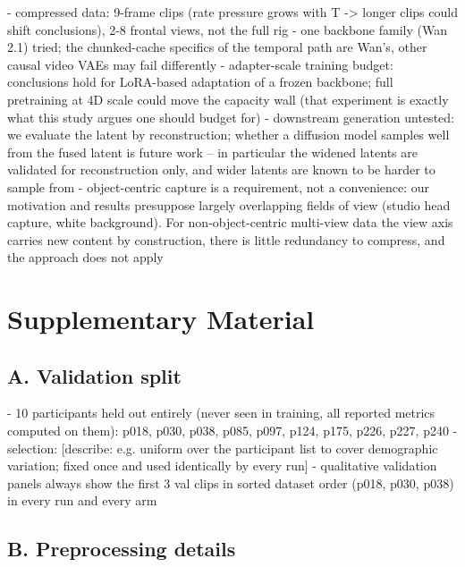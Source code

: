 - compressed data: 9-frame clips (rate pressure grows with T -> longer clips could shift conclusions), 2-8 frontal views, not the full rig
- one backbone family (Wan 2.1) tried; the chunked-cache specifics of the temporal path are Wan's, other causal video VAEs may fail differently
- adapter-scale training budget: conclusions hold for LoRA-based adaptation of a frozen backbone; full pretraining at 4D scale could move the capacity wall (that experiment is exactly what this study argues one should budget for)
- downstream generation untested: we evaluate the latent by reconstruction; whether a diffusion model samples well from the fused latent is future work -- in particular the widened latents are validated for reconstruction only, and wider latents are known to be harder to sample from \cite{yao2025vavae}
- object-centric capture is a requirement, not a convenience: our motivation and results presuppose largely overlapping fields of view (studio head capture, white background). For non-object-centric multi-view data the view axis carries new content by construction, there is little redundancy to compress, and the approach does not apply


\clearpage
\appendix
\section*{Supplementary Material}

\subsection*{A. Validation split}

- 10 participants held out entirely (never seen in training, all reported metrics computed on them): p018, p030, p038, p085, p097, p124, p175, p226, p227, p240
- selection: [describe: e.g. uniform over the participant list to cover demographic variation; fixed once and used identically by every run]
- qualitative validation panels always show the first 3 val clips in sorted dataset order (p018, p030, p038) in every run and every arm

\subsection*{B. Preprocessing details}

